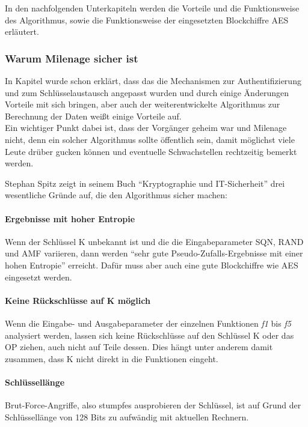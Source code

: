 In den nachfolgenden Unterkapiteln werden die Vorteile und die Funktionsweise des
Algorithmus, sowie die Funktionsweise der eingesetzten Blockchiffre \ac{AES} erläutert.

 \subsubsection{Warum Milenage sicher ist}
 In Kapitel  wurde schon erklärt, dass das die Mechanismen
 zur Authentifizierung und zum Schlüsselaustausch angepasst wurden und durch einige
 Änderungen Vorteile mit sich bringen, aber auch der weiterentwickelte Algorithmus zur
 Berechnung der Daten weißt einige Vorteile auf. \\
 Ein wichtiger Punkt dabei ist, dass der Vorgänger geheim war und Milenage nicht, denn ein
 solcher Algorithmus sollte öffentlich sein, damit möglichst viele Leute drüber gucken können und
 eventuelle Schwachstellen rechtzeitig bemerkt werden. 
 
 Stephan Spitz zeigt in seinem Buch ``Kryptographie und IT-Sicherheit''  \cite{spitz11} drei
 wesentliche Gründe auf, die den Algorithmus sicher machen:
 
 \paragraph{Ergebnisse mit hoher Entropie}
 Wenn der Schlüssel \ac{K} unbekannt ist und die die Eingabeparameter \ac{SQN}, \ac{RAND}
 und \ac{AMF} variieren, dann werden ``sehr gute Pseudo-Zufalls-Ergebnisse mit einer hohen
 Entropie'' \cite{spitz11} erreicht. Dafür muss aber auch eine gute Blockchiffre wie AES
 eingesetzt werden.
 
 \paragraph{Keine Rückschlüsse auf K möglich}
 Wenn die Eingabe- und Ausgabeparameter der einzelnen Funktionen \emph{f1} bis \emph{f5}
 analysiert werden, lassen sich keine Rückschlüsse auf den Schlüssel K oder das \acf{OP}
 ziehen, auch nicht auf Teile dessen. Dies hängt unter anderem damit zusammen, dass K nicht
 direkt in die Funktionen eingeht.
 
 \paragraph{Schlüssellänge}
 Brut-Force-Angriffe, also stumpfes ausprobieren der Schlüssel, ist auf Grund der
 Schlüssellänge von 128 Bits zu aufwändig mit aktuellen Rechnern.
 
